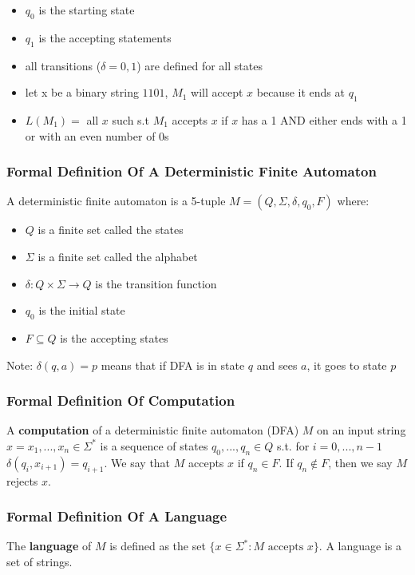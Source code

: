 \documentclass[11pt,a4paper]{article}
\begin{document}
\begin{itemize}
    \item $q_0$ is the starting state
    \item $q_1$ is the accepting statements
    \item all transitions ($\delta=0,1$) are defined for all states
    \item let x be a binary string $1101$, $M_1$ will accept $x$ because it ends at $q_1$
    \item $L(M_1)=$ all $x$ such s.t $M_1$ accepts $x$ if $x$ has a 1 AND either ends with a 1 or with an even number of 0s
\end{itemize}

\subsubsection{Formal Definition Of A Deterministic Finite Automaton}
\begin{definition}
    A deterministic finite automaton is a 5-tuple $M=(Q, \Sigma, \delta, q_0, F)$ where:
    \begin{itemize}
        \item $Q$ is a finite set called the states
        \item $\Sigma$ is a finite set called the alphabet
        \item $\delta: Q\times\Sigma\rightarrow Q$ is the transition function
        \item $q_0$ is the initial state
        \item $F\subseteq Q$ is the accepting states
    \end{itemize}
    Note: $\delta(q,a)=p$ means that if DFA is in state $q$ and sees $a$, it goes to state $p$
\end{definition}

\newpage
\subsubsection{Formal Definition Of Computation}
\begin{definition}
    A \textbf{computation} of a deterministic finite automaton (DFA) $M$ on an input string $x=x_1,...,x_n\in\Sigma^*$ is a sequence of states $q_0,...,q_n\in Q$ s.t. for $i=0,...,n-1$ $\delta(q_i,x_{i+1})=q_{i+1}$.
    We say that $M$ accepts $x$ if $q_n\in F$.
    If $q_n\notin F$, then we say $M$ rejects $x$.
\end{definition}

\subsubsection{Formal Definition Of A Language}
\begin{definition}
    The \textbf{language} of $M$ is defined as the set $\{x\in\Sigma^*: M\text{ accepts }x\}$.
    A language is a set of strings.
\end{definition}
\end{document}
